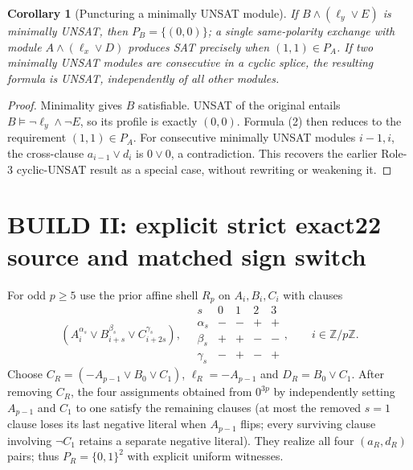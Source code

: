 \documentclass[11pt]{article}
\newtheorem{corollary}[theorem]{Corollary}
\begin{document}
\begin{corollary}[Puncturing a minimally UNSAT module]\label{cor:puncture}
If $B\land(\ell_y\lor E)$ is minimally UNSAT, then $P_B=\{(0,0)\}$; a single same-polarity exchange with module $A\land(\ell_x\lor D)$ produces SAT precisely when $(1,1)\in P_A$. If two minimally UNSAT modules are consecutive in a cyclic splice, the resulting formula is UNSAT, independently of all other modules.
\end{corollary}
\begin{proof}
Minimality gives $B$ satisfiable. UNSAT of the original entails $B\models\neg\ell_y\land\neg E$, so its profile is exactly $(0,0)$. Formula (2) then reduces to the requirement $(1,1)\in P_A$. For consecutive minimally UNSAT modules $i-1,i$, the cross-clause $a_{i-1}\vee d_i$ is $0\vee0$, a contradiction. This recovers the earlier Role-3 cyclic-UNSAT result as a special case, without rewriting or weakening it.\end{proof}

\section{BUILD II: explicit strict exact22 source and matched sign switch}
For odd $p\ge5$ use the prior affine shell $R_p$ on $A_i,B_i,C_i$ with clauses
\[
(A_i^{\alpha_s}\lor B_{i+s}^{\beta_s}\lor C_{i+2s}^{\gamma_s}),\quad
\begin{array}{c|rrrr}s&0&1&2&3\\\hline
\alpha_s&-&-&+&+\\\beta_s&+&+&-&-\\\gamma_s&-&+&-&+
\end{array},\qquad i\in\mathbb Z/p\mathbb Z.
\]
Choose $C_R=(-A_{p-1}\lor B_0\lor C_1)$, $\ell_R=-A_{p-1}$ and $D_R=B_0\lor C_1$. After removing $C_R$, the four assignments obtained from $0^{3p}$ by independently setting $A_{p-1}$ and $C_1$ to one satisfy the remaining clauses (at most the removed $s=1$ clause loses its last negative literal when $A_{p-1}$ flips; every surviving clause involving $\neg C_1$ retains a separate negative literal). They realize all four $(a_R,d_R)$ pairs; thus $P_R=\{0,1\}^2$ with explicit uniform witnesses.
\end{document}
